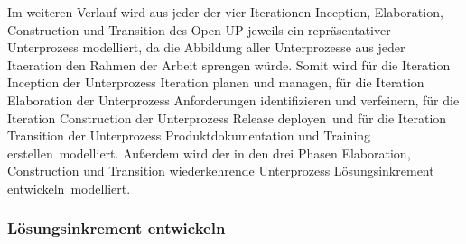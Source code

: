 Im weiteren Verlauf wird aus jeder der vier Iterationen Inception, Elaboration, Construction und Transition des Open UP jeweils ein repräsentativer Unterprozess modelliert, da die Abbildung aller Unterprozesse aus jeder Itaeration den Rahmen der Arbeit sprengen würde. \newline
Somit wird für die Iteration Inception der Unterprozess \grqq Iteration planen und managen\grqq, für die Iteration Elaboration der Unterprozess \grqq Anforderungen identifizieren und verfeinern, für die Iteration Construction der Unterprozess \grqq Release deployen\grqq \ und für die Iteration Transition der Unterprozess \grqq Produktdokumentation und Training erstellen\grqq \ modelliert. Außerdem wird der in den drei Phasen Elaboration, Construction und Transition wiederkehrende Unterprozess \grqq Lösungsinkrement entwickeln\grqq \ modelliert.

\subsubsection{Lösungsinkrement entwickeln}


